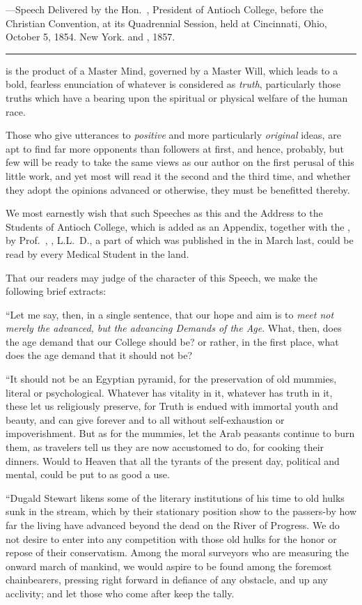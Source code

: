
\smallornament
\footnotesize
{}---Speech Delivered by the Hon.~, President of
Antioch College, before the Christian Convention, at its Quadrennial Session, held at
Cincinnati, Ohio, October 5, 1854. New York.  and , 1857.
\plainbreak{1}
\normalsize

 is the product of a Master Mind, governed by a Master Will,
which leads to a bold, fearless enunciation of whatever is considered as
\emph{truth}, particularly those truths which have a bearing upon the spiritual
or physical welfare of the human race.

Those who give utterances to \emph{positive} and more particularly \emph{original}
ideas, are apt to find far more opponents than followers at first, and
hence, probably, but few will be ready to take the same views as our
author on the first perusal of this little work, and yet most will read it
the second and the third time, and whether they adopt the opinions
advanced or otherwise, they must be benefitted thereby.

We most earnestly wish that such Speeches as this and the Address
to the Students of Antioch College, which is added as an Appendix,
together with the , by Prof.~, \md, L.L.~D., a part of which was
published in the  in March last, could be read by every
Medical Student in the land.

That our readers may judge of the character of this Speech, we
make the following brief extracts:

``Let me say, then, in a single sentence, that our hope and aim is to
\emph{meet not merely the advanced, but the advancing Demands of the Age}.
What, then, does the age demand that our College should be? or rather,
in the first place, what does the age demand that it should not be?

``It should not be an Egyptian pyramid, for the preservation of old
mummies, literal or psychological. Whatever has vitality in it, whatever
has truth in it, these let us religiously preserve, for Truth is endued
with immortal youth and beauty, and can give forever and to all without
self-exhaustion or impoverishment. But as for the mummies, let
the Arab peasants continue to burn them, as travelers tell us they are
now accustomed to do, for cooking their dinners. Would to Heaven
that all the tyrants of the present day, political and mental, could be
put to as good a use.

``Dugald Stewart likens some of the literary institutions of his time
to old hulks sunk in the stream, which by their stationary position
show to the passers-by how far the living have advanced beyond the
dead on the River of Progress. We do not desire to enter into any
competition with those old hulks for the honor or repose of their conservatism.
Among the moral surveyors who are measuring the onward
march of mankind, we would aspire to be found among the foremost
chainbearers, pressing right forward in defiance of any obstacle, and
up any acclivity; and let those who come after keep the tally.\endinput
